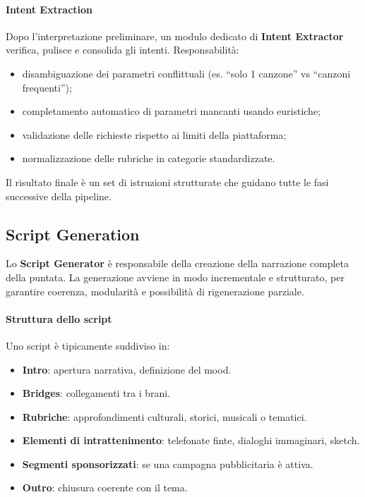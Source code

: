 \documentclass[11pt,a4paper]{article}
\begin{document}
\paragraph{Intent Extraction}

Dopo l’interpretazione preliminare, un modulo dedicato di \textbf{Intent Extractor} verifica, pulisce e consolida gli intenti.  
Responsabilità:
\begin{itemize}
    \item disambiguazione dei parametri conflittuali (es. “solo 1 canzone” vs “canzoni frequenti”);
    \item completamento automatico di parametri mancanti usando euristiche;
    \item validazione delle richieste rispetto ai limiti della piattaforma;
    \item normalizzazione delle rubriche in categorie standardizzate.
\end{itemize}

Il risultato finale è un set di istruzioni strutturate che guidano tutte le fasi successive della pipeline.


\subsection{Script Generation}

Lo \textbf{Script Generator} è responsabile della creazione della narrazione completa della puntata.  
La generazione avviene in modo incrementale e strutturato, per garantire coerenza, modularità e possibilità di rigenerazione parziale.

\paragraph{Struttura dello script}

Uno script è tipicamente suddiviso in:
\begin{itemize}
    \item \textbf{Intro}: apertura narrativa, definizione del mood.
    \item \textbf{Bridges}: collegamenti tra i brani.
    \item \textbf{Rubriche}: approfondimenti culturali, storici, musicali o tematici.
    \item \textbf{Elementi di intrattenimento}: telefonate finte, dialoghi immaginari, sketch.
    \item \textbf{Segmenti sponsorizzati}: se una campagna pubblicitaria è attiva.
    \item \textbf{Outro}: chiusura coerente con il tema.
\end{itemize}
\end{document}
